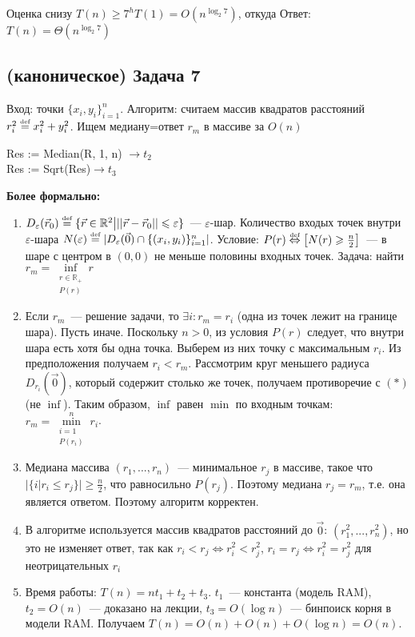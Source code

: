 \documentclass[a4paper]{article}
\def\eps{\varepsilon}
\def\eqdef{\overset{\mbox{\tiny def}}{=}}
\begin{document}
Оценка снизу $T(n)\geqslant 7^hT(1)=O(n^{\log_2 7})$, откуда\newline
Ответ: $\boxed{T(n)=\Theta(n^{\log_2 7})}$
\newpage
\subsection*{(каноническое) Задача 7}
Вход: точки $\{x_i,y_i\}_{i=1}^n$.\newline
Алгоритм: считаем массив квадратов расстояний $r_i^2\eqdef x_i^2+y_i^2$. Ищем медиану=ответ $r_m$ в массиве за $O(n)$\newline
\begin{algorithm}[H]
 \SetAlgoLined
Res := Median(R, 1, n) $\rightarrow t_2$\\
Res := Sqrt(Res)$\rightarrow t_3$\\
\end{algorithm} $ $
\\[5pt]
{\bf Более формально:}
\begin{enumerate}
\item $D_\eps(\vec{r}_0)\eqdef\{\vec{r}\in\mathbb{R}^2\big|||\vec{r}-\vec{r}_0||\leqslant \eps\}$~--- $\eps$-шар. Количество входых точек внутри $\eps$-шара $N(\eps)\eqdef|D_\eps(\vec{0})\cap\{(x_i,y_i)\}_{i=1}^n|$.\newline
Условие: $P(r)\overset{\mbox{\tiny def}}{\Leftrightarrow} \left[N(r)\geqslant\frac{n}{2}\right]$~--- в шаре с центром в $(0,0)$ не меньше половины входных точек.\newline
Задача: найти $r_m=\inf\limits_{\substack{r\in\mathbb{R_+}\\P(r)}} r$
\item Если $r_m$~--- решение задачи, то $\exists i\colon r_m=r_i$ (одна из точек лежит на границе шара).\newline
Пусть иначе. Поскольку $n>0$, из условия $P(r)$ следует, что внутри шара есть хотя бы одна точка. Выберем из них точку с максимальным $r_i$. Из предположения получаем $r_i<r_m$. Рассмотрим круг меньшего радиуса $D_{r_i}(\vec{0})$, который содержит столько же точек, получаем противоречие с $(*)$ (не $\inf$).\newline
Таким образом, $\inf$ равен $\min$ по входным точкам: $r_m=\min\limits_{\substack{i=1\\P(r_i)}}^nr_i$.
\item Медиана массива $(r_1,...,r_n)$~--- минимальное $r_j$ в массиве, такое что $\big|\{i\big|r_i\leqslant r_j\}\big|\geqslant\frac{n}{2}$, что равносильно $P(r_j)$. Поэтому медиана $r_j=r_m$, т.е. она является ответом. Поэтому алгоритм корректен.
\item В алгоритме используется массив квадратов расстояний до $\vec{0}$: $(r_1^2,...,r_n^2)$, но это не изменяет ответ, так как $r_i<r_j\Leftrightarrow r_i^2<r_j^2$, $r_i=r_j\Leftrightarrow r_i^2=r_j^2$ для неотрицательных $r_i$
\item Время работы: $T(n)=nt_1+t_2+t_3$. $t_1$~--- константа (модель RAM), $t_2=O(n)$~--- доказано на лекции, $t_3=O(\log n)$~--- бинпоиск корня в модели RAM. Получаем $T(n)=O(n)+O(n)+O(\log n)=O(n)$.
\end{enumerate}
\end{document}
